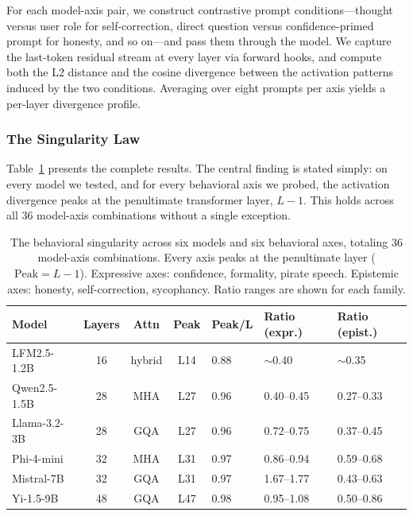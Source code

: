 \documentclass[11pt,a4paper]{article}
\begin{document}
For each model-axis pair, we construct contrastive prompt conditions---thought versus user role for self-correction, direct question versus confidence-primed prompt for honesty, and so on---and pass them through the model. We capture the last-token residual stream at every layer via forward hooks, and compute both the L2 distance and the cosine divergence between the activation patterns induced by the two conditions. Averaging over eight prompts per axis yields a per-layer divergence profile.

\subsubsection{The Singularity Law}

Table~\ref{tab:singularity} presents the complete results. The central finding is stated simply: on every model we tested, and for every behavioral axis we probed, the activation divergence peaks at the penultimate transformer layer, $L-1$. This holds across all 36 model-axis combinations without a single exception.

\begin{table}[htbp]
\centering
\begin{tabular}{lccclll}
\toprule
Model & Layers & Attn & Peak & Peak/L & Ratio (expr.) & Ratio (epist.) \\
\midrule
LFM2.5-1.2B & 16 & hybrid & L14 & 0.88 & $\sim$0.40 & $\sim$0.35 \\
Qwen2.5-1.5B & 28 & MHA & L27 & 0.96 & 0.40--0.45 & 0.27--0.33 \\
Llama-3.2-3B & 28 & GQA & L27 & 0.96 & 0.72--0.75 & 0.37--0.45 \\
Phi-4-mini & 32 & MHA & L31 & 0.97 & 0.86--0.94 & 0.59--0.68 \\
Mistral-7B & 32 & GQA & L31 & 0.97 & 1.67--1.77 & 0.43--0.63 \\
Yi-1.5-9B & 48 & GQA & L47 & 0.98 & 0.95--1.08 & 0.50--0.86 \\
\bottomrule
\end{tabular}
\caption{The behavioral singularity across six models and six behavioral axes, totaling 36 model-axis combinations. Every axis peaks at the penultimate layer ($\text{Peak} = L-1$). Expressive axes: confidence, formality, pirate speech. Epistemic axes: honesty, self-correction, sycophancy. Ratio ranges are shown for each family.}
\label{tab:singularity}
\end{table}
\end{document}
